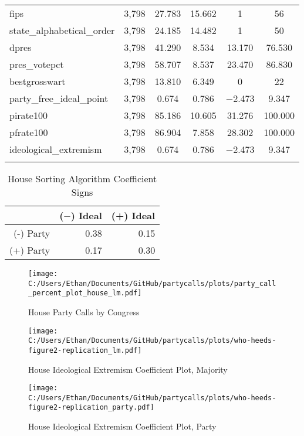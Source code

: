 \documentclass[12pt]{article}
\begin{document}
\begin{table}[!htbp]
\begin{tabular}{@{\extracolsep{5pt}}lccccc}
		fips & 3,798 & 27.783 & 15.662 & 1 & 56 \\ 
		state\_alphabetical\_order & 3,798 & 24.185 & 14.482 & 1 & 50 \\ 
		dpres & 3,798 & 41.290 & 8.534 & 13.170 & 76.530 \\ 
		pres\_votepct & 3,798 & 58.707 & 8.537 & 23.470 & 86.830 \\ 
		bestgrosswart & 3,798 & 13.810 & 6.349 & 0 & 22 \\ 
		party\_free\_ideal\_point & 3,798 & 0.674 & 0.786 & $-$2.473 & 9.347 \\ 
		pirate100 & 3,798 & 85.186 & 10.605 & 31.276 & 100.000 \\ 
		pfrate100 & 3,798 & 86.904 & 7.858 & 28.302 & 100.000 \\ 
		ideological\_extremism & 3,798 & 0.674 & 0.786 & $-$2.473 & 9.347 \\ 
		\hline \\[-1.8ex] 
	\end{tabular} 
\end{table} 

\begin{table}[H]
	\centering
	\caption{House Sorting Algorithm Coefficient Signs}
	\begin{tabular}{rrr}
		\hline
		& ($-$) Ideal & (+) Ideal \\ 
		\hline
		(-) Party & 0.38 & 0.15 \\ 
		(+) Party & 0.17 & 0.30 \\ 
		\hline
	\end{tabular}
\end{table}

\begin{figure}[H]
	\centering
	\caption{House Party Calls by Congress}
	\texttt{[image: C:/Users/Ethan/Documents/GitHub/partycalls/plots/party\_call\_percent\_plot\_house\_lm.pdf]}
\end{figure}

\begin{figure}[H]
	\centering
	\caption{House Ideological Extremism Coefficient Plot, Majority}
	\texttt{[image: C:/Users/Ethan/Documents/GitHub/partycalls/plots/who-heeds-figure2-replication\_lm.pdf]}
\end{figure}

\begin{figure}[H]
	\centering
	\caption{House Ideological Extremism Coefficient Plot, Party}
	\texttt{[image: C:/Users/Ethan/Documents/GitHub/partycalls/plots/who-heeds-figure2-replication\_party.pdf]}
\end{figure}
\end{document}
